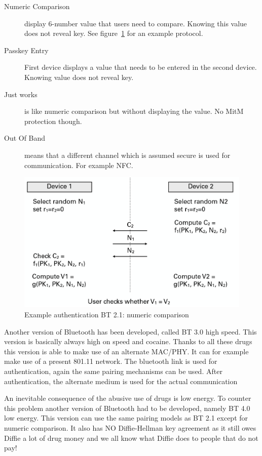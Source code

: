\documentclass{article}
\begin{document}
\begin{description}
\item[Numeric Comparison] display 6-number value that users need to compare. Knowing this value does not reveal key. See figure~\ref{fig:bt_authentication_2.1} for an example protocol. 
\item[Passkey Entry] First device displays a value that needs to be entered in the second device. Knowing value does not reveal key.
\item[Just works] is like numeric comparison but without displaying the value. No MitM protection though.
\item[Out Of Band] means that a different channel which is assumed secure is used for communication. For example NFC.
\end{description}

\begin{figure}[!h]
\centering
\includegraphics[width=\textwidth, height=\textheight, keepaspectratio]{images/bt_communication_21.png}
\caption{Example authentication BT 2.1: numeric comparison}
\label{fig:bt_authentication_2.1}
\end{figure}

Another version of Bluetooth has been developed, called BT 3.0 high speed. This version is basically always high on speed and cocaine. Thanks to all these drugs this version is able to make use of an alternate MAC/PHY. It can for example make use of a present 801.11 network. The bluetooth link is used for authentication, again the same pairing mechanisms can be used. After authentication, the alternate medium is used for the actual communication

An inevitable consequence of the abusive use of drugs is low energy. To counter this problem another version of Bluetooth had to be developed, namely BT 4.0 low energy. This version can use the same pairing models as BT 2.1 except for numeric comparison. It also has NO Diffie-Hellman key agreement as it still owes Diffie a lot of drug money and we all know what Diffie does to people that do not pay!
\end{document}
